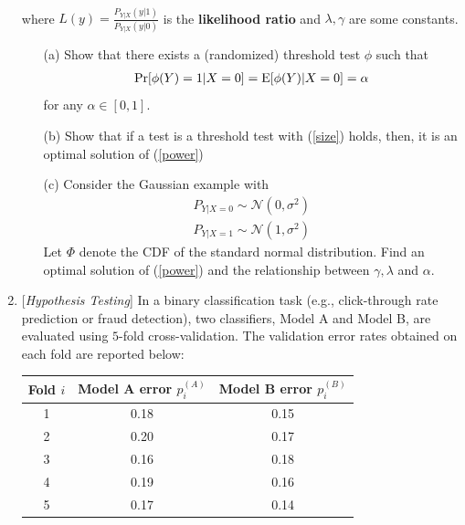\documentclass[10pt]{article}
\begin{document}
\begin{enumerate}
\begin{definition}
\begin{align*}
    \end{align*}
    where $L(y) = \frac{P_{Y|X}(y|1)}{P_{Y|X}(y|0)}$ is the \textbf{likelihood ratio} and $\lambda,\gamma$ are some constants.
\end{definition}
\begin{itemize}
    \item [(a)] Show that there exists a (randomized) threshold test $\phi$ such that \begin{align}\label{size}
        \Pr[\phi(Y)=1|X = 0] = \E[\phi(Y)|X = 0] = \alpha
    \end{align} 
    for any $\alpha\in[0,1]$.
    \item [(b)] Show that if a test is a threshold test with (\ref{size}) holds, then, it is an optimal solution of (\ref{power}) 
    \item [(c)]Consider the Gaussian example with 
    \begin{align*}
    P_{Y|X = 0}\sim \mathcal{N}(0,\sigma^2)\\
    P_{Y|X = 1}\sim \mathcal{N}(1,\sigma^2)
    \end{align*}
    Let $\Phi$ denote the CDF of the standard normal distribution. Find an optimal solution of (\ref{power}) and the relationship between $\gamma,\lambda$ and $\alpha$. 
\end{itemize}


\newpage







\item {} {[}\textit{Hypothesis Testing}{]}
In a binary classification task (e.g., click-through rate prediction or fraud detection),
two classifiers, Model A and Model B, are evaluated using
$5$-fold cross-validation.
The validation error rates obtained on each fold are reported below:

\begin{center}
\begin{tabular}{c|cc}
\hline
Fold $i$ & Model A error $p_i^{(A)}$ & Model B error $p_i^{(B)}$ \\
\hline
1 & 0.18 & 0.15 \\
2 & 0.20 & 0.17 \\
3 & 0.16 & 0.18 \\
4 & 0.19 & 0.16 \\
5 & 0.17 & 0.14 \\
\hline
\end{tabular}
\end{center}


\end{enumerate}
\end{document}
